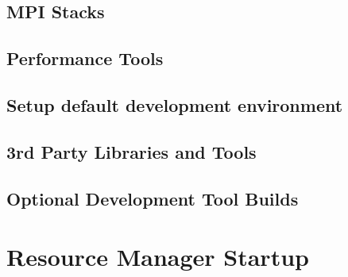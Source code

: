 \documentclass{ohpc-doc}
\begin{document}
\section{MPI Stacks} \label{sec:mpi}


\section{Performance Tools} \label{sec:install_perf_tools}


\section{Setup default development environment}


\section{3rd Party Libraries and Tools} \label{sec:3rdparty}





\section{Optional Development Tool Builds} \label{sec:3rdparty_intel}


\chapter{Resource Manager Startup} \label{sec:rms_startup}

\appendix






\end{document}
